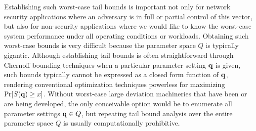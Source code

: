 Establishing such worst-case tail bounds is important not only for network
security applications where an adversary is in full or partial control of
this vector, but also for non-security applications where we would like to
know the worst-case system performance under all operating conditions or workloads.
Obtaining such worst-case bounds is very difficult because the parameter
space $Q$ is typically gigantic. Although establishing tail bounds is
often straightforward through Chernoff bounding
techniques when a particular parameter setting $\mathbf{q}$ is given,
such bounds typically cannot be expressed as a closed form function of $\mathbf{q}$,
rendering conventional optimization techniques powerless for maximizing $\Pr[S(\mathbf{q}) \ge x]$.
Without worst-case large deviation machineries that have been or are being developed, the only
conceivable option would be to enumerate all parameter settings $\mathbf{q}\in Q$, but repeating tail
bound analysis over the entire parameter space $Q$ is usually computationally prohibitive.


